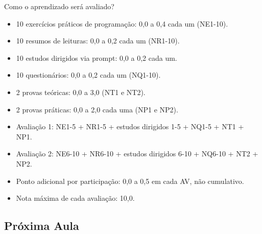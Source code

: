 \begin{frame}{Como o aprendizado será avaliado?}
\scriptsize
\begin{itemize}
  \item 10 exercícios práticos de programação: 0,0 a 0,4 cada um (NE1-10).
  \item 10 resumos de leituras: 0,0 a 0,2 cada um (NR1-10).
  \item 10 estudos dirigidos via prompt: 0,0 a 0,2 cada um.
  \item 10 questionários: 0,0 a 0,2 cada um (NQ1-10).
  \item 2 provas teóricas: 0,0 a 3,0 (NT1 e NT2).
  \item 2 provas práticas: 0,0 a 2,0 cada uma (NP1 e NP2).
  \item Avaliação 1: NE1-5 + NR1-5 + estudos dirigidos 1-5 + NQ1-5 + NT1 + NP1.
  \item Avaliação 2: NE6-10 + NR6-10 + estudos dirigidos 6-10 + NQ6-10 + NT2 + NP2.
  \item Ponto adicional por participação: 0,0 a 0,5 em cada AV, não cumulativo.
  \item Nota máxima de cada avaliação: 10,0.
\end{itemize}

\planreference
\end{frame}

\subsection{Próxima Aula}

